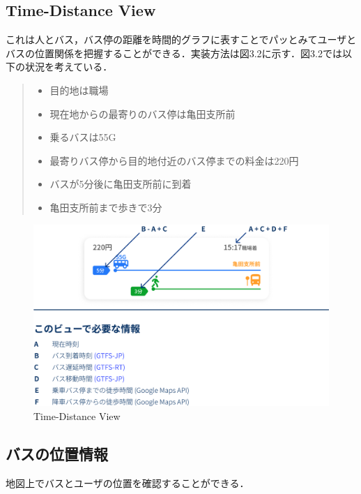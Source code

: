 \subsection{Time-Distance View}
これは人とバス，バス停の距離を時間的グラフに表すことでパッとみてユーザとバスの位置関係を把握することができる．実装方法は図3.2に示す．図3.2では以下の状況を考えている．

\begin{quote}
    \begin{itemize}
        \item 目的地は職場
        \item 現在地からの最寄りのバス停は亀田支所前
        \item 乗るバスは55G
        \item 最寄りバス停から目的地付近のバス停までの料金は220円
        \item バスが5分後に亀田支所前に到着
        \item 亀田支所前まで歩きで3分
    \end{itemize}
\end{quote}

\begin{figure}[htbp]
    \centering
    \includegraphics[width=12cm]{images/feature_timedistanceview.png}
    \caption{Time-Distance View}
    \label{fig:feature_timedistanceview}
\end{figure}
\pagebreak
\subsection{バスの位置情報}
地図上でバスとユーザの位置を確認することができる．

